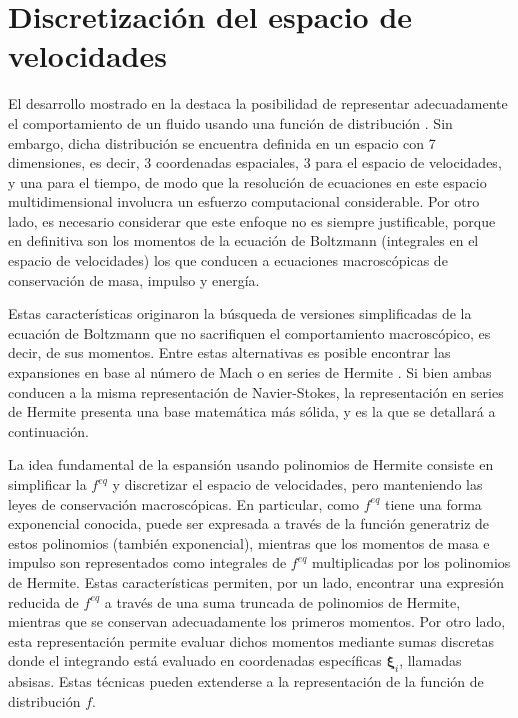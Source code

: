 \section{Discretizaci\'on del espacio de velocidades} 
El desarrollo mostrado en la  destaca la posibilidad de representar adecuadamente el comportamiento de un fluido usando una funci\'on de distribuci\'on \fvar{}. Sin embargo, dicha distribuci\'on se encuentra definida en un espacio con 7 dimensiones, es decir, 3 coordenadas espaciales, 3 para el espacio de velocidades, y una para el tiempo, de modo que la resoluci\'on de ecuaciones en este espacio multidimensional involucra un esfuerzo computacional considerable. Por otro lado, es necesario considerar que este enfoque no es siempre justificable, porque en definitiva son los momentos de la ecuaci\'on de Boltzmann (integrales en el espacio de velocidades) los que conducen a ecuaciones macrosc\'opicas de conservaci\'on de masa, impulso y energ\'ia. 
\par 
Estas caracter\'isticas originaron la b\'usqueda de versiones simplificadas de la ecuaci\'on de Boltzmann que no sacrifiquen el comportamiento macrosc\'opico, es decir, de sus momentos. Entre estas alternativas es posible encontrar las expansiones en base al n\'umero de Mach \cite{he_lattice_1997} o en series de Hermite \cite{shan_kinetic_2006}. Si bien ambas conducen a la misma representaci\'on de Navier-Stokes, la representaci\'on en series de Hermite presenta una base matem\'atica m\'as s\'olida, y es la que se detallar\'a a continuaci\'on.
\par
La idea fundamental de la espansi\'on usando polinomios de Hermite consiste en simplificar la \edf{} $f^{eq}$ y discretizar el espacio de velocidades, pero manteniendo las leyes de conservaci\'on macrosc\'opicas. En particular, como $f^{eq}$ tiene una forma exponencial conocida, puede ser expresada a trav\'es de la funci\'on generatriz de estos polinomios (tambi\'en exponencial), mientras que los momentos de masa e impulso son representados como integrales de $f^{eq}$ multiplicadas por los polinomios de Hermite. Estas caracter\'isticas permiten, por un lado, encontrar una expresi\'on reducida de $f^{eq}$ a trav\'es de una suma truncada de polinomios de Hermite, mientras que se conservan adecuadamente los primeros momentos. Por otro lado, esta representaci\'on permite evaluar dichos momentos mediante sumas discretas donde el integrando est\'a evaluado en coordenadas espec\'ificas $\bm{\xi}_i$, llamadas absisas. Estas t\'ecnicas pueden extenderse a la representaci\'on de la funci\'on de distribuci\'on $f$.


